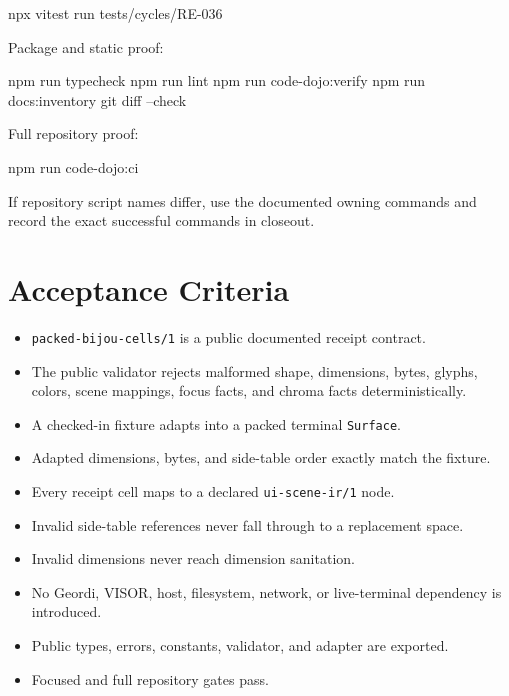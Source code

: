 \begin{CodeBlock}
npx vitest run tests/cycles/RE-036
\end{CodeBlock}

Package and static proof:

\begin{CodeBlock}
npm run typecheck
npm run lint
npm run code-dojo:verify
npm run docs:inventory
git diff --check
\end{CodeBlock}

Full repository proof:

\begin{CodeBlock}
npm run code-dojo:ci
\end{CodeBlock}

If repository script names differ, use the documented owning commands and record the exact successful commands in closeout.

\section{Acceptance Criteria}\label{record-164-acceptance-criteria}

\begin{itemize}
\tightlist
\item
  \texttt{p\allowbreak{}a\allowbreak{}c\allowbreak{}k\allowbreak{}e\allowbreak{}d\allowbreak{}-\allowbreak{}b\allowbreak{}i\allowbreak{}j\allowbreak{}o\allowbreak{}u\allowbreak{}-\allowbreak{}c\allowbreak{}e\allowbreak{}l\allowbreak{}l\allowbreak{}s\allowbreak{}/\allowbreak{}1} is a public documented receipt contract.
\item
  The public validator rejects malformed shape, dimensions, bytes, glyphs, colors, scene mappings, focus facts, and chroma facts deterministically.
\item
  A checked-in fixture adapts into a packed terminal \texttt{S\allowbreak{}u\allowbreak{}r\allowbreak{}f\allowbreak{}a\allowbreak{}c\allowbreak{}e}.
\item
  Adapted dimensions, bytes, and side-table order exactly match the fixture.
\item
  Every receipt cell maps to a declared \texttt{u\allowbreak{}i\allowbreak{}-\allowbreak{}s\allowbreak{}c\allowbreak{}e\allowbreak{}n\allowbreak{}e\allowbreak{}-\allowbreak{}i\allowbreak{}r\allowbreak{}/\allowbreak{}1} node.
\item
  Invalid side-table references never fall through to a replacement space.
\item
  Invalid dimensions never reach dimension sanitation.
\item
  No Geordi, VISOR, host, filesystem, network, or live-terminal dependency is introduced.
\item
  Public types, errors, constants, validator, and adapter are exported.
\item
  Focused and full repository gates pass.
\end{itemize}

